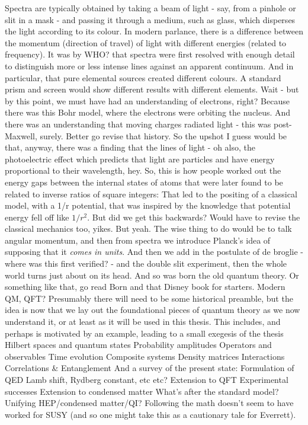 Spectra are typically obtained by taking a beam of light - say, from a
pinhole or slit in a mask - and passing it through a medium, such as
glass, which disperses the light according to its colour. In modern
parlance, there is a difference between the momentum (direction of
travel) of light with different energies (related to frequency). It was
by WHO? that spectra were first resolved with enough detail to
distinguish more or less intense lines against an apparent continuum.
And in particular, that pure elemental sources created different
colours. A standard prism and screen would show different results with
different elements. Wait - but by this point, we must have had an
understanding of electrons, right? Because there was this Bohr model,
where the electrons were orbiting the nucleus. And there was an
understanding that moving charges radiated light - this was
post-Maxwell, surely. Better go revise that history. So the upshot I
guess would be that, anyway, there was a finding that the lines of light
- oh also, the photoelectric effect which predicts that light are
particles and have energy proportional to their wavelength, hey. So,
this is how people worked out the energy gaps between the internal
states of atoms that were later found to be related to inverse ratios of
square integers: That led to the positing of a classical model, with a
1/r potential, that was inspired by the knowledge that potential energy
fell off like $1/r^2$. But did we get this backwards? Would have to
revise the classical mechanics too, yikes. But yeah. The wise thing to
do would be to talk angular momentum, and then from spectra we introduce
Planck's idea of supposing that it \emph{comes in units}. And then we
add in the postulate of de broglie - where was this first verified? -
and the double slit experiment, then the whole world turns just about on
its head. And so was born the old quantum theory. Or something like
that, go read Born and that Disney book for starters. Modern QM, QFT?
Presumably there will need to be some historical preamble, but the idea
is now that we lay out the foundational pieces of quantum theory as we
now understand it, or at least as it will be used in this thesis. This
includes, and perhaps is motivated by an example, leading to a small
exegesis of the thesis Hilbert spaces and quantum states Probability
amplitudes Operators and observables Time evolution Composite systems
Density matrices Interactions Correlations \& Entanglement And a survey
of the present state: Formulation of QED Lamb shift, Rydberg constant,
etc etc? Extension to QFT Experimental successes Extension to condensed
matter What's after the standard model? Unifying HEP/condensed
matter/QI? Following the math doesn't seem to have worked for SUSY (and
so one might take this as a cautionary tale for Everrett).

